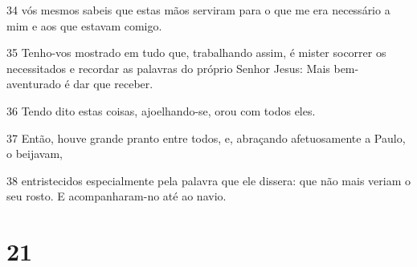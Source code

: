 \par 34 vós mesmos sabeis que estas mãos serviram para o que me era necessário a mim e aos que estavam comigo.
\par 35 Tenho-vos mostrado em tudo que, trabalhando assim, é mister socorrer os necessitados e recordar as palavras do próprio Senhor Jesus: Mais bem-aventurado é dar que receber.
\par 36 Tendo dito estas coisas, ajoelhando-se, orou com todos eles.
\par 37 Então, houve grande pranto entre todos, e, abraçando afetuosamente a Paulo, o beijavam,
\par 38 entristecidos especialmente pela palavra que ele dissera: que não mais veriam o seu rosto. E acompanharam-no até ao navio.

\chapter{21}

